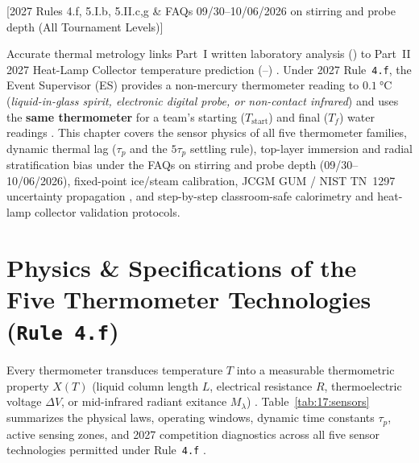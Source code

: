 [2027 Rules 4.f, 5.I.b, 5.II.c,g \& FAQs 09/30--10/06/2026 on stirring and probe depth (All Tournament Levels)]

Accurate thermal metrology links Part~I written laboratory analysis () to Part~II 2027 Heat-Lamp Collector temperature prediction (--) . Under 2027 Rule~\texttt{4.f}, the Event Supervisor (ES) provides a non-mercury thermometer reading to $\SI{0.1}{\celsius}$ (\emph{liquid-in-glass spirit, electronic digital probe, or non-contact infrared}) and uses the \textbf{same thermometer} for a team's starting ($T_{\mathrm{start}}$) and final ($T_f$) water readings . This chapter covers the sensor physics of all five thermometer families, dynamic thermal lag ($\tau_p$ and the $5\tau_p$ settling rule), top-layer immersion and radial stratification bias under the FAQs on stirring and probe depth (09/30--10/06/2026), fixed-point ice/steam calibration, JCGM GUM / NIST TN~1297 uncertainty propagation , and step-by-step classroom-safe calorimetry and heat-lamp collector validation protocols.

\section{Physics \& Specifications of the Five Thermometer Technologies (\texttt{Rule 4.f})}\label{sec:17.1}

Every thermometer transduces temperature $T$ into a measurable thermometric property $X(T)$ (liquid column length $L$, electrical resistance $R$, thermoelectric voltage $\Delta V$, or mid-infrared radiant exitance $M_{\lambda}$) . Table~\ref{tab:17:sensors} summarizes the physical laws, operating windows, dynamic time constants $\tau_p$, active sensing zones, and 2027 competition diagnostics across all five sensor technologies permitted under Rule~\texttt{4.f} .

